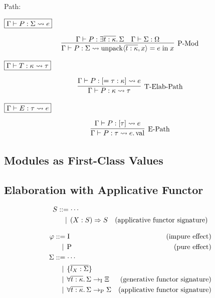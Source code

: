 Path:

$\fbox{$\Gamma \vdash P: \Sigma \rightsquigarrow e$}$

\begin{gather*}
  \infer[\text{P-Mod}]{\Gamma \vdash P: \Sigma \elaborate \symunpack\langle \overline{t: \kappa}, x\rangle = e \symin x}{
    \Gamma \vdash P: \exists \overline{t: \kappa}\ldotp \Sigma
    &
    \Gamma \vdash \Sigma: \Omega
  }
\end{gather*}

$\fbox{$\Gamma \vdash T: \kappa \rightsquigarrow \tau$}$

\begin{gather*}
  \infer[\text{T-Elab-Path}]{\Gamma \vdash P: \kappa \elaborate \tau}{
    \Gamma \vdash P: [= \tau: \kappa] \elaborate e
  }
\end{gather*}

$\fbox{$\Gamma \vdash E: \tau \rightsquigarrow e$}$

\begin{gather*}
  \infer[\text{E-Path}]{\Gamma \vdash P: \tau \elaborate e.\symval}{
    \Gamma \vdash P: [\tau] \elaborate e
  }
\end{gather*}

\subsection{Modules as First-Class Values}

\subsection{Elaboration with Applicative Functor}

\begin{align*}
  S
  &\BNFassign \cdots \\
  &\BNFor (X: S) \Rightarrow S &(\text{applicative functor signature})
\end{align*}

\newcommand*{\symP}{\mathrm{P}}
\newcommand*{\symI}{\mathrm{I}}

\begin{align*}
  \varphi
  &\BNFassign \symI &(\text{impure effect}) \\
  &\BNFor \symP &(\text{pure effect}) \\
  \Sigma
  &\BNFassign \cdots \\
  &\BNFor \{\overline{l_X: \Sigma}\} \\
  &\BNFor \forall \overline{t: \kappa}\ldotp \Sigma \to_\symI \Xi &(\text{generative functor signature}) \\
  &\BNFor \forall \overline{t: \kappa}\ldotp \Sigma \to_\symP \Sigma &(\text{applicative functor signature})
\end{align*}


